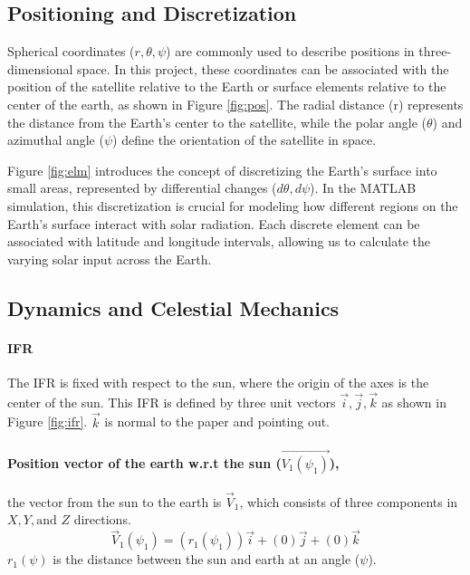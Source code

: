\documentclass[11pt]{article}
\begin{document}
\subsection{Positioning and Discretization}

Spherical coordinates ($r,\theta,\psi$) are commonly used to describe positions in three-dimensional space. In this project, these coordinates can be associated with the position of the satellite relative to the Earth or surface elements relative to the center of the earth, as shown in Figure \ref{fig:pos}. The radial distance (r) represents the distance from the Earth's center to the satellite, while the polar angle ($\theta$) and azimuthal angle ($\psi$) define the orientation of the satellite in space.

Figure \ref{fig:elm} introduces the concept of discretizing the Earth's surface into small areas, represented by differential changes ($d\theta, d\psi$). In the MATLAB simulation, this discretization is crucial for modeling how different regions on the Earth's surface interact with solar radiation. Each discrete element can be associated with latitude and longitude intervals, allowing us to calculate the varying solar input across the Earth.







\subsection{Dynamics and Celestial Mechanics}
\paragraph{\ac{IFR}} 
The \ac{IFR} is fixed with respect to the sun, where the origin of the axes is the center of the sun. This \ac{IFR} is defined by three unit vectors $\vec{i}, \vec{j}, \vec{k}$ as shown in Figure \ref{fig:ifr}. $\vec{k}$ is normal to the paper and pointing out.

 
 
\paragraph{Position vector of the earth w.r.t the sun ($\vec{V_1(\psi_1)}$),}

the vector from the sun to the earth is $\vec{V}_{1}$, which consists of three components in $X, Y, \text{and } Z$ directions. %
\begin{equation}\label{eq:01}
    \vec{V}_{1}(\psi_{1}) = (r_{1}(\psi_1)) \vec{i} + (0) \vec{j} + (0) \vec{k}\end{equation}
$r_{1}(\psi)$ is the distance between the sun and earth at an angle ($\psi$).
\end{document}

